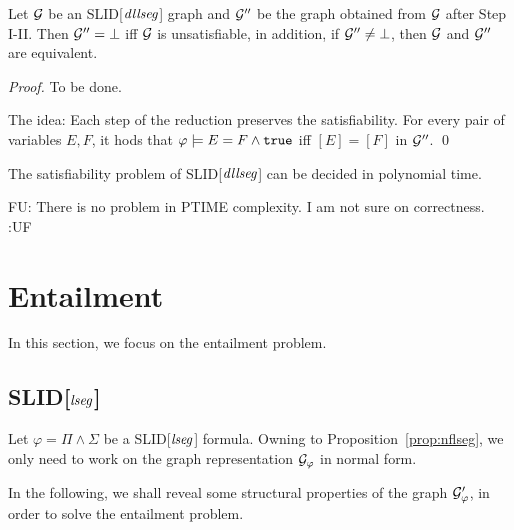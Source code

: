 \documentclass{llncs}
\newcommand{\fu}[1]{\color{purple} {FU: #1 :UF} \color{black}}
\begin{document}


\begin{proposition} \label{prop:nfdllseg}
Let $\mathcal{G}$ be an SLID[$\mathit{dllseg}$] graph and $\mathcal{G}''$ be the graph obtained from $\mathcal{G}$ after Step I-II.  Then $\mathcal{G}'' = \bot$ iff $\mathcal{G}$ is unsatisfiable, in addition, if $\mathcal{G}''  \neq \bot$, then $\mathcal{G}$ and $\mathcal{G}''$ are equivalent.
\end{proposition}

\begin{proof}
To be done.

The idea: Each step of the reduction preserves the satisfiability. For every pair of variables $E,F$, it hods that $\varphi \models E = F \wedge \mathtt{true}$ iff $[E]=[F]$ in $\mathcal{G}''$.
\qed
\end{proof}




\begin{theorem}
The satisfiability problem of SLID[$\mathit{dllseg}$] can be decided in polynomial time.
\end{theorem}

\fu{There is no problem in PTIME complexity. I am not sure on correctness.}
\section{Entailment}

In this section, we focus on the entailment problem.
\subsection{SLID[$\mathit{lseg}$]}


Let $\varphi = \Pi \wedge \Sigma$ be a SLID[$\mathit{lseg}$] formula. Owning to Proposition~\ref{prop:nflseg}, we only need to work on the graph representation $\mathcal{G}_\varphi$ in  normal form.

In the following, we shall reveal some structural properties of the graph $\mathcal{G}'_\varphi$, in order to solve the entailment problem.
\end{document}
